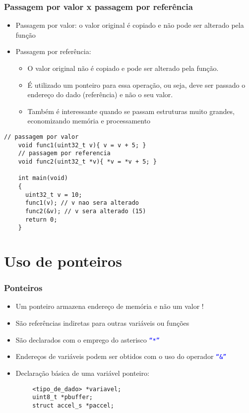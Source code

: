 \documentclass{beamer}
\begin{document}
\begin{frame}[fragile]
	\frametitle{Passagem por valor x passagem por referência}
	\begin{itemize}
		\item Passagem por valor: o valor original é copiado e não pode ser alterado pela função
		\item Passagem por referência:
		\begin{itemize}
			\item O valor original não é copiado e pode ser alterado pela função.
            \item É utilizado um ponteiro para essa operação, ou seja, deve ser passado o endereço do dado (referência) e não o seu valor.
			\item Também é interessante quando se passam estruturas muito grandes, economizando memória e processamento
		\end{itemize}
	\end{itemize}
    {\tiny
	\begin{lstlisting}[style=customc]
    // passagem por valor
    void func1(uint32_t v){ v = v + 5; }
    // passagem por referencia
    void func2(uint32_t *v){ *v = *v + 5; }

    int main(void)
    {
      uint32_t v = 10;
      func1(v); // v nao sera alterado
      func2(&v); // v sera alterado (15)
      return 0;
    }
	\end{lstlisting}
    }
\end{frame}

\section{Uso de ponteiros}

\begin{frame}[fragile]
	\frametitle{Ponteiros}
	\begin{itemize}
		\item Um ponteiro armazena endereço de memória e não um valor !
		\item São referências indiretas para outras variáveis ou funções
		\item São declarados com o emprego do asterisco \texttt{\textcolor{blue}{``*''}}
		\item Endereços de variáveis podem ser obtidos com o uso do operador \texttt{\textcolor{blue}{``\&''}}
		\item Declaração básica de uma variável ponteiro:
	\end{itemize}
    {\footnotesize
	\begin{verbatim}
        <tipo_de_dado> *variavel;
        uint8_t *pbuffer;
        struct accel_s *paccel;
	\end{verbatim}
    }
\end{frame}
\end{document}
